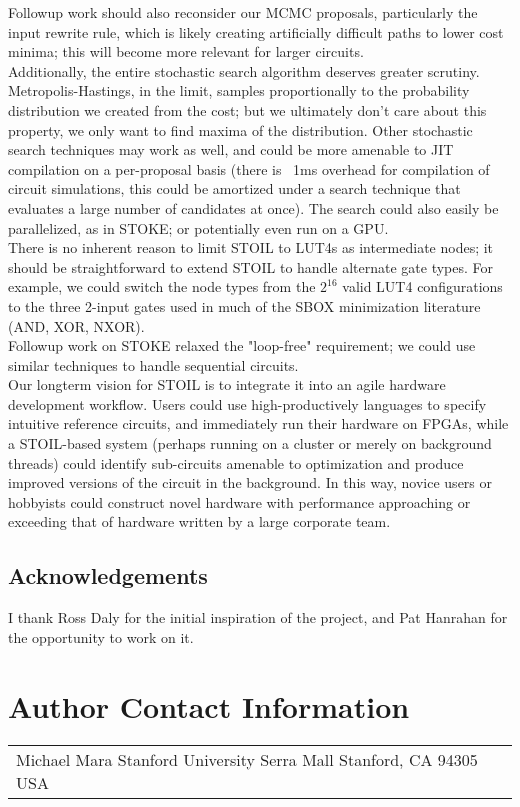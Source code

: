 \documentclass{article}
\begin{document}
Followup work should also reconsider our MCMC proposals, particularly the input rewrite rule, which is likely creating artificially difficult paths to lower cost minima; this will become more relevant for larger circuits.\\

Additionally, the entire stochastic search algorithm deserves greater scrutiny. Metropolis-Hastings, in the limit, samples proportionally to the probability distribution we created from the cost; but we ultimately don't care about this property, we only want to find maxima of the distribution. Other stochastic search techniques may work as well, and could be more amenable to JIT compilation on a per-proposal basis (there is ~1ms overhead for compilation of circuit simulations, this could be amortized under a search technique that evaluates a large number of candidates at once). The search could also easily be parallelized, as in STOKE; or potentially even run on a GPU.\\

There is no inherent reason to limit STOIL to LUT4s as intermediate nodes; it should be straightforward to extend STOIL to handle alternate gate types. For example, we could switch the node types from the $2^16$ valid LUT4 configurations to the three 2-input gates used in much of the SBOX minimization literature (AND, XOR, NXOR).\\

Followup work on STOKE relaxed the "loop-free" requirement; we could use similar techniques to handle sequential circuits.\\

Our longterm vision for STOIL is to integrate it into an agile hardware development workflow. Users could use high-productively languages to specify intuitive reference circuits, and immediately run their hardware on FPGAs, while a STOIL-based system (perhaps running on a cluster or merely on background threads) could identify sub-circuits amenable to optimization and produce improved versions of the circuit in the background. In this way, novice users or hobbyists could construct novel hardware with performance approaching or exceeding that of hardware written by a large corporate team.



\subsection*{Acknowledgements}
I thank Ross Daly for the initial inspiration of the project, and Pat Hanrahan for the opportunity to work on it.





\section*{Author Contact Information}

\hspace{-2mm}\begin{tabular}{p{}p{}}
Michael Mara \newline
Stanford University \newline
353 Serra Mall \newline
Stanford, CA 94305 \newline
USA\newline
\end{tabular}
\end{document}
